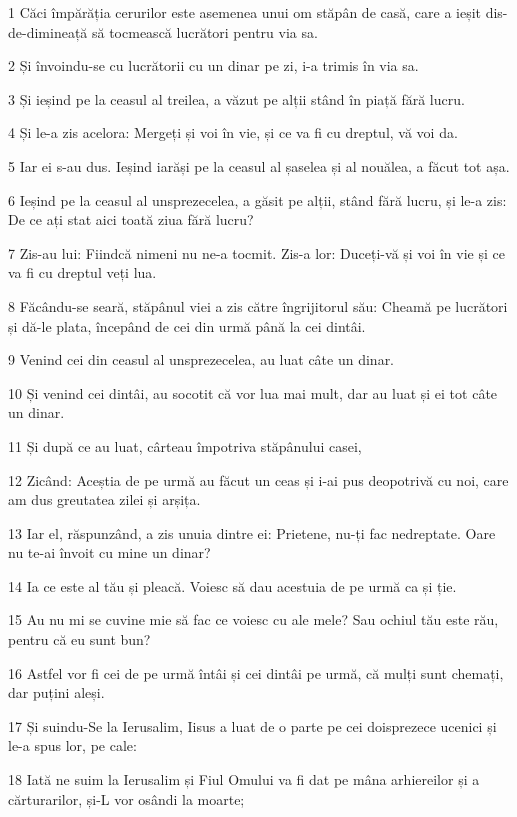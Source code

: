 \par 1 Căci împărăția cerurilor este asemenea unui om stăpân de casă, care a ieșit dis-de-dimineață să tocmească lucrători pentru via sa.
\par 2 Și învoindu-se cu lucrătorii cu un dinar pe zi, i-a trimis în via sa.
\par 3 Și ieșind pe la ceasul al treilea, a văzut pe alții stând în piață fără lucru.
\par 4 Și le-a zis acelora: Mergeți și voi în vie, și ce va fi cu dreptul, vă voi da.
\par 5 Iar ei s-au dus. Ieșind iarăși pe la ceasul al șaselea și al nouălea, a făcut tot așa.
\par 6 Ieșind pe la ceasul al unsprezecelea, a găsit pe alții, stând fără lucru, și le-a zis: De ce ați stat aici toată ziua fără lucru?
\par 7 Zis-au lui: Fiindcă nimeni nu ne-a tocmit. Zis-a lor: Duceți-vă și voi în vie și ce va fi cu dreptul veți lua.
\par 8 Făcându-se seară, stăpânul viei a zis către îngrijitorul său: Cheamă pe lucrători și dă-le plata, începând de cei din urmă până la cei dintâi.
\par 9 Venind cei din ceasul al unsprezecelea, au luat câte un dinar.
\par 10 Și venind cei dintâi, au socotit că vor lua mai mult, dar au luat și ei tot câte un dinar.
\par 11 Și după ce au luat, cârteau împotriva stăpânului casei,
\par 12 Zicând: Aceștia de pe urmă au făcut un ceas și i-ai pus deopotrivă cu noi, care am dus greutatea zilei și arșița.
\par 13 Iar el, răspunzând, a zis unuia dintre ei: Prietene, nu-ți fac nedreptate. Oare nu te-ai învoit cu mine un dinar?
\par 14 Ia ce este al tău și pleacă. Voiesc să dau acestuia de pe urmă ca și ție.
\par 15 Au nu mi se cuvine mie să fac ce voiesc cu ale mele? Sau ochiul tău este rău, pentru că eu sunt bun?
\par 16 Astfel vor fi cei de pe urmă întâi și cei dintâi pe urmă, că mulți sunt chemați, dar puțini aleși.
\par 17 Și suindu-Se la Ierusalim, Iisus a luat de o parte pe cei doisprezece ucenici și le-a spus lor, pe cale:
\par 18 Iată ne suim la Ierusalim și Fiul Omului va fi dat pe mâna arhiereilor și a cărturarilor, și-L vor osândi la moarte;
